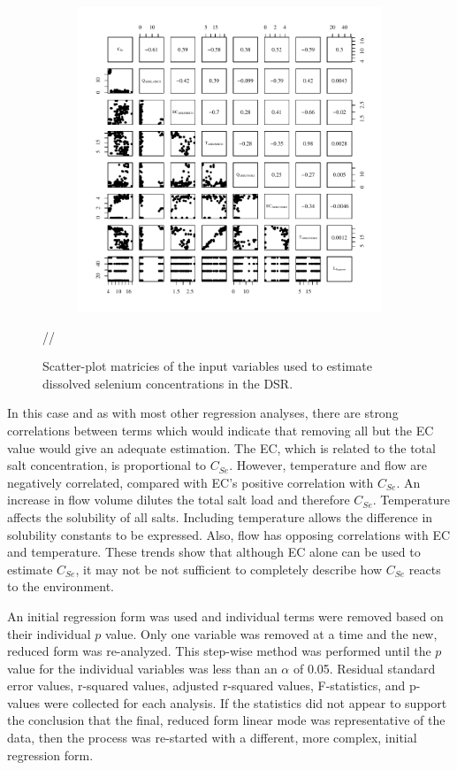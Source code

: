 \begin{linenumbers}
\begin{landscape}
\begin{figure}
\begin{subfigure}{0.7\textwidth}
			\includegraphics[width=\tableCustomSize]{"Figures/Results_DSR/Stochastic/Conc Model Full PairsDDIV"}
		\end{subfigure}//
		\caption{Scatter-plot matricies of the input variables used to estimate dissolved selenium concentrations in the DSR.}
	\end{figure}
\end{landscape}
\subfiguretop

In this case and as with most other regression analyses, there are strong correlations between terms which would indicate that removing all but the EC value would give an adequate estimation.  The EC, which is related to the total salt concentration, is proportional to $C_{Se}$.  However, temperature and flow are negatively correlated, compared with EC's positive correlation with $C_{Se}$.  An increase in flow volume dilutes the total salt load and therefore $C_{Se}$.  Temperature affects the solubility of all salts.  Including temperature allows the difference in solubility constants to be expressed.  Also, flow has opposing correlations with EC and temperature.  These trends show that although EC alone can be used to estimate $C_{Se}$, it may not be not sufficient to completely describe how $C_{Se}$ reacts to the environment.

An initial regression form was used and individual terms were removed based on their individual $p$ value.  Only one variable was removed at a time and the new, reduced form was re-analyzed.  This step-wise method was performed until the $p$ value for the individual variables was less than an $\alpha$ of 0.05.  Residual standard error values, r-squared values, adjusted r-squared values, F-statistics, and p-values were collected for each analysis.  If the statistics did not appear to support the conclusion that the final, reduced form linear mode was representative of the data, then the process was re-started with a different, more complex, initial regression form.


\end{linenumbers}
